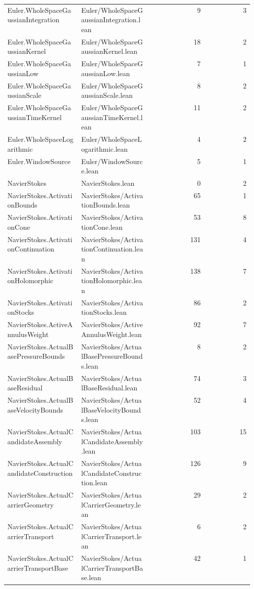 \begin{longtable}{p{0.30\linewidth}p{0.28\linewidth}rr}
Euler.WholeSpaceGaussianIntegration & Euler/WholeSpaceGaussianIntegration.lean & 9 & 3\\
Euler.WholeSpaceGaussianKernel & Euler/WholeSpaceGaussianKernel.lean & 18 & 2\\
Euler.WholeSpaceGaussianLow & Euler/WholeSpaceGaussianLow.lean & 7 & 1\\
Euler.WholeSpaceGaussianScale & Euler/WholeSpaceGaussianScale.lean & 8 & 2\\
Euler.WholeSpaceGaussianTimeKernel & Euler/WholeSpaceGaussianTimeKernel.lean & 11 & 2\\
Euler.WholeSpaceLogarithmic & Euler/WholeSpaceLogarithmic.lean & 4 & 2\\
Euler.WindowSource & Euler/WindowSource.lean & 5 & 1\\
NavierStokes & NavierStokes.lean & 0 & 2\\
NavierStokes.ActivationBounds & NavierStokes/ActivationBounds.lean & 65 & 1\\
NavierStokes.ActivationCone & NavierStokes/ActivationCone.lean & 53 & 8\\
NavierStokes.ActivationContinuation & NavierStokes/ActivationContinuation.lean & 131 & 4\\
NavierStokes.ActivationHolomorphic & NavierStokes/ActivationHolomorphic.lean & 138 & 7\\
NavierStokes.ActivationStocks & NavierStokes/ActivationStocks.lean & 86 & 2\\
NavierStokes.ActiveAnnulusWeight & NavierStokes/ActiveAnnulusWeight.lean & 92 & 7\\
NavierStokes.ActualBasePressureBounds & NavierStokes/ActualBasePressureBounds.lean & 8 & 2\\
NavierStokes.ActualBaseResidual & NavierStokes/ActualBaseResidual.lean & 74 & 3\\
NavierStokes.ActualBaseVelocityBounds & NavierStokes/ActualBaseVelocityBounds.lean & 52 & 4\\
NavierStokes.ActualCandidateAssembly & NavierStokes/ActualCandidateAssembly.lean & 103 & 15\\
NavierStokes.ActualCandidateConstruction & NavierStokes/ActualCandidateConstruction.lean & 126 & 9\\
NavierStokes.ActualCarrierGeometry & NavierStokes/ActualCarrierGeometry.lean & 29 & 2\\
NavierStokes.ActualCarrierTransport & NavierStokes/ActualCarrierTransport.lean & 6 & 2\\
NavierStokes.ActualCarrierTransportBase & NavierStokes/ActualCarrierTransportBase.lean & 42 & 1\\

\end{longtable}
